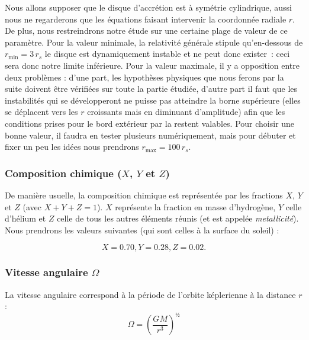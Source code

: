 Nous allons supposer que le disque d’accrétion est à symétrie cylindrique,
aussi nous ne regarderons que les équations faisant intervenir la coordonnée
radiale $r$. De plus, nous restreindrons notre étude sur une certaine plage de
valeur de ce paramètre. Pour la valeur minimale, la relativité générale stipule
qu’en-dessous de $r_\mathrm{min} = \num{3}\, r_s$ le disque est dynamiquement instable et ne
peut donc exister : ceci sera donc notre limite inférieure. Pour la valeur
maximale, il y a opposition entre deux problèmes : d’une part, les hypothèses
physiques que nous ferons par la suite doivent être vérifiées sur toute la
partie étudiée, d’autre part il faut que les instabilités qui se développeront
ne puisse pas atteindre la borne supérieure (elles se déplacent vers les $r$
croissants mais en diminuant d’amplitude) afin que les conditions prises pour
le bord extérieur par la restent valables. Pour choisir une bonne valeur, il
faudra en tester plusieurs numériquement, mais pour débuter et fixer un peu les
idées nous prendrons $r_\mathrm{max} = \num{100}\, r_s$.

\subsubsection{\texorpdfstring{Composition chimique ($X$, $Y$ et $Z$)}{Composition chimique (X, Y et Z)}}

De manière usuelle, la composition chimique est représentée par les fractions
$X$, $Y$ et $Z$ (avec $X + Y + Z = 1$). $X$ représente la fraction en masse
d’hydrogène, $Y$ celle d’hélium et $Z$ celle de tous les autres éléments réunis
(et est appelée \textit{metallicité}). Nous prendrons les valeurs suivantes
(qui sont celles à la surface du soleil) :

\begin{equation}
    \label{eq:compo_chimique}
    X = \num{0.70}, Y = \num{0.28}, Z = \num{0.02}.
\end{equation}

\subsubsection{\texorpdfstring{Vitesse angulaire $\Omega$}{Vitesse angulaire Ω}}

La vitesse angulaire correspond à la période de l’orbite képlerienne à la distance $r$ :
\begin{equation}
    \label{eq:vitesse_angulaire}
    \Omega = \left( \frac{G M}{r^{\num{3}}} \right)^½
\end{equation}

